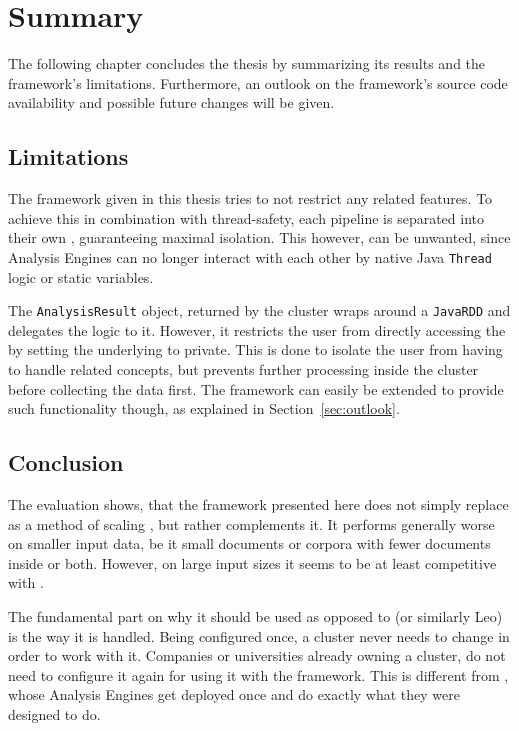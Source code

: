 \chapter{Summary}\label{ch:summary}
The following chapter concludes the thesis by summarizing its results and the framework's limitations. Furthermore, an outlook on the framework's source code availability and possible future changes will be given.

\section{Limitations}
The framework given in this thesis tries to not restrict any \uima{} related features. To achieve this in combination with thread-safety, each pipeline is separated into their own \jvm{}, guaranteeing maximal isolation. This however, can be unwanted, since Analysis Engines can no longer interact with each other by native Java \lstinline|Thread| logic or static variables. 

The \lstinline|AnalysisResult| object, returned by the \spark{} cluster wraps around a \lstinline|JavaRDD| and delegates the logic to it. However, it restricts the user from directly accessing the \spark{} \api{} by setting the underlying \rdd{} to private. This is done to isolate the user from having to handle \spark{} related concepts, but prevents further processing inside the cluster before collecting the data first. The framework can easily be extended to provide such functionality though, as explained in Section~\ref{sec:outlook}. 

\section{Conclusion}
The evaluation shows, that the framework presented here does not simply replace \uimaas{} as a method of scaling \uima{}, but rather complements it. It performs generally worse on smaller input data, be it small documents or corpora with fewer documents inside or both. However, on large input sizes it seems to be at least competitive with \uimaas{}. 

The fundamental part on why it should be used as opposed to \uimaas{} (or similarly Leo) is the way it is handled. Being configured once, a \spark{} cluster never needs to change in order to work with it. Companies or universities already owning a \spark{} cluster, do not need to configure it again for using it with the framework. This is different from \uimaas{}, whose Analysis Engines get deployed once and do exactly what they were designed to do. 

